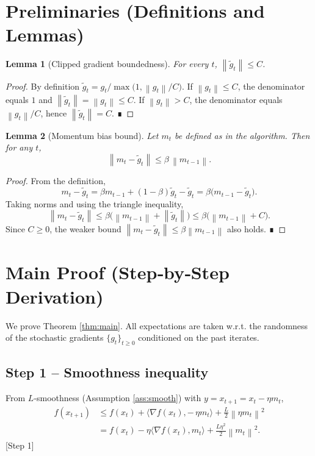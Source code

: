 \documentclass{article}
\newtheorem{lemma}{Lemma}
\newcommand{\norm}[1]{\left\|#1\right\|}
\newcommand{\grad}{\nabla}
\begin{document}
\newpage
\section*{Preliminaries (Definitions and Lemmas)}
\begin{lemma}[Clipped gradient boundedness]\label{lem:clipbound}
For every $t$, $\norm{\tilde g_t}\le C$.
\end{lemma}
\begin{proof}
By definition $\tilde g_t = g_t/\max\bigl(1,\norm{g_t}/C\bigr)$.  
If $\norm{g_t}\le C$, the denominator equals $1$ and $\norm{\tilde g_t}=\norm{g_t}\le C$.  
If $\norm{g_t}> C$, the denominator equals $\norm{g_t}/C$, hence $\norm{\tilde g_t}=C$. ∎
\end{proof}

\begin{lemma}[Momentum bias bound]\label{lem:mombias}
Let $m_t$ be defined as in the algorithm. Then for any $t$,
\[
    \norm{m_t-\tilde g_t}\le \beta\,\norm{m_{t-1}} .
\]
\end{lemma}
\begin{proof}
From the definition,
\[
m_t-\tilde g_t = \beta m_{t-1}+(1-\beta)\tilde g_t-\tilde g_t
               = \beta\bigl(m_{t-1}-\tilde g_t\bigr).
\]
Taking norms and using the triangle inequality,
\[
\norm{m_t-\tilde g_t}\le \beta\bigl(\norm{m_{t-1}}+\norm{\tilde g_t}\bigr)
                     \le \beta\bigl(\norm{m_{t-1}}+C\bigr).
\]
Since $C\ge0$, the weaker bound $\norm{m_t-\tilde g_t}\le\beta\norm{m_{t-1}}$ also holds. ∎
\end{proof}

\section*{Main Proof (Step‑by‑Step Derivation)}
We prove Theorem \ref{thm:main}. All expectations are taken w.r.t. the randomness of the stochastic gradients $\{g_t\}_{t\ge0}$ conditioned on the past iterates.

\subsection*{Step 1 – Smoothness inequality}
From $L$‑smoothness (Assumption \ref{ass:smooth}) with $y=x_{t+1}=x_t-\eta m_t$,
\begin{align}
    f(x_{t+1}) &\le f(x_t)+\langle\grad f(x_t),-\,\eta m_t\rangle
                 +\frac{L}{2}\norm{\eta m_t}^2 \nonumber\\
               &= f(x_t)-\eta\langle\grad f(x_t), m_t\rangle
                 +\frac{L\eta^2}{2}\norm{m_t}^2 .
\tag{2}
\end{align}
[Step 1]
\end{document}
